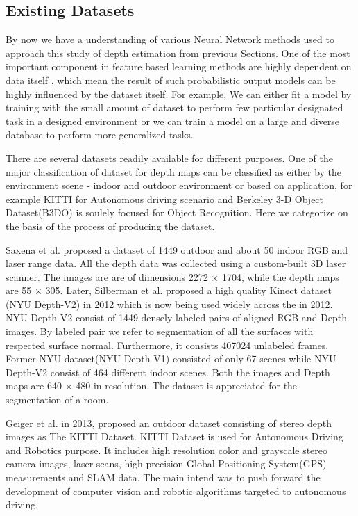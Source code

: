 \subsection{Existing Datasets}

By now we have a understanding of various Neural Network methods used to approach this study of depth estimation from previous Sections. One of the most important component in feature based learning methods are highly dependent on data itself \cite{friedman2001elements}, which mean the result of such probabilistic output models can be highly influenced by the dataset itself. For example, We can either fit a model by training with the small amount of dataset to perform few particular designated task in a designed environment or we can train a model on a large and diverse database to perform more generalized tasks.

There are several datasets readily available for different purposes. One of the major classification of dataset for depth maps can be classified as either by the environment scene - indoor and outdoor environment or based on application, for example KITTI for Autonomous driving \cite{Geiger2013IJRR} scenario and Berkeley 3-D Object Dataset(B3DO) \cite{Janoch:EECS-2012-85} is soulely focused for Object Recognition. Here we categorize on the basis of the process of producing the dataset.

Saxena et al. \cite{saxena2006learning} proposed a dataset of 1449 outdoor and about 50 indoor RGB and laser range data. All the depth data was collected using a custom-built 3D laser scanner. The images are are of dimensions 2272 $\times$ 1704, while the depth maps are 55 $\times$ 305. Later, Silberman et al. \cite{Silberman:ECCV12} proposed a high quality Kinect dataset (NYU Depth-V2) in 2012 which is now being used widely across the in 2012. NYU Depth-V2 \cite{Silberman:ECCV12} consist of 1449 densely labeled pairs of aligned RGB and Depth images. By labeled pair we refer to segmentation of all the surfaces with respected surface normal. Furthermore, it consists 407024 unlabeled frames. Former NYU dataset(NYU Depth V1) \cite{silberman11indoor} consisted of only 67 scenes while NYU Depth-V2 consist of 464 different indoor scenes. Both the images and Depth maps are 640 $\times$ 480 in resolution. The dataset is appreciated for the segmentation of a room.

Geiger et al. \cite{Geiger2013IJRR} in 2013, proposed an outdoor dataset consisting of stereo depth images as The KITTI Dataset. KITTI Dataset is used for Autonomous Driving and Robotics purpose. It includes high resolution color and grayscale stereo camera images, laser scans, high-precision Global Positioning System(GPS) measurements and SLAM data. The main intend was to push forward the development of computer vision and robotic algorithms targeted to autonomous driving.

